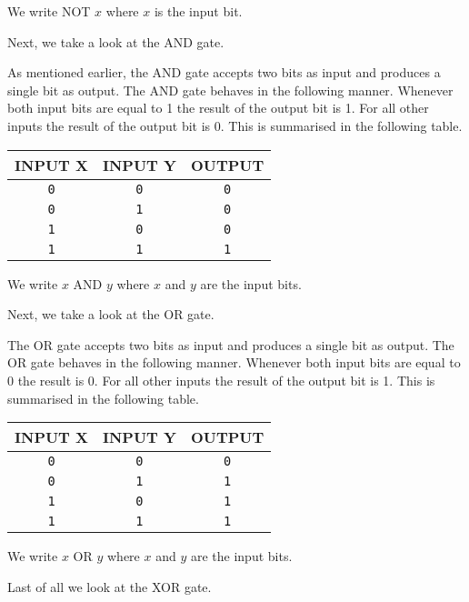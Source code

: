 We write NOT $x$ where $x$ is the input bit.

Next, we take a look at the AND gate.

As mentioned earlier, the AND gate accepts two bits as input and produces a single bit as output. The AND gate behaves in the following manner. Whenever both input bits are equal to 1 the result of the output bit is 1. For all other inputs the result of the output bit is 0. This is summarised in the following table.
\begin{center}
	\begin{tabular}{cc|c}
	  \hline
		INPUT X & INPUT Y & OUTPUT \\ \hline
		\texttt{0} & \texttt{0} & \texttt{0} \\ \hline
		\texttt{0} & \texttt{1} & \texttt{0} \\ \hline
		\texttt{1} & \texttt{0} & \texttt{0} \\ \hline
		\texttt{1} & \texttt{1} & \texttt{1} \\ \hline
	\end{tabular}
\end{center}

We write $x$ AND $y$ where $x$ and $y$ are the input bits.

Next, we take a look at the OR gate.

The OR gate accepts two bits as input and produces a single bit as output. The OR gate behaves in the following manner. Whenever both input bits are equal to 0 the result is 0. For all other inputs the result of the output bit is 1. This is summarised in the following table.
\begin{center}
	\begin{tabular}{cc|c}
	  \hline
		INPUT X & INPUT Y & OUTPUT \\ \hline
		\texttt{0} & \texttt{0} & \texttt{0} \\ \hline
		\texttt{0} & \texttt{1} & \texttt{1} \\ \hline
		\texttt{1} & \texttt{0} & \texttt{1} \\ \hline
		\texttt{1} & \texttt{1} & \texttt{1} \\ \hline
	\end{tabular}
\end{center}

We write $x$ OR $y$ where $x$ and $y$ are the input bits.

Last of all we look at the XOR gate.


